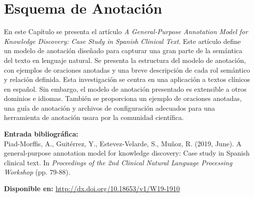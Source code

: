 
\chapter[Esquema de Anotación: \textit{A General-Purpose Annotation Model for Knowledge Discovery: Case Study in Spanish Clinical Text}]{Esquema de Anotación}
\label{Chap:Schema}

En este Capítulo se presenta el artículo \textit{A General-Purpose Annotation Model for Knowledge Discovery: Case Study in Spanish Clinical Text}. Este artículo define un modelo de anotación diseñado para capturar una gran parte de la semántica del texto en lenguaje natural. Se presenta la estructura del modelo de anotación, con ejemplos de oraciones anotadas y una breve descripción de cada rol semántico y relación definida. Esta investigación se centra en una aplicación a textos clínicos en español. Sin embargo, el modelo de anotación presentado es extensible a otros dominios e idiomas. También se proporciona un ejemplo de oraciones anotadas, una guía de anotación y archivos de configuración adecuados para una herramienta de anotación usara por la comunidad científica.

\BlankLine
\noindent \textbf{Entrada bibliográfica:}\\
Piad-Morffis, A., Guitérrez, Y., Estevez-Velarde, S., Muñoz, R. (2019, June). A general-purpose annotation model for knowledge discovery: Case study in Spanish clinical text. In \textit{Proceedings of the 2nd Clinical Natural Language Processing Workshop} (pp. 79-88).

\BlankLine
\noindent \textbf{Disponible en:} \url{http://dx.doi.org/10.18653/v1/W19-1910}
